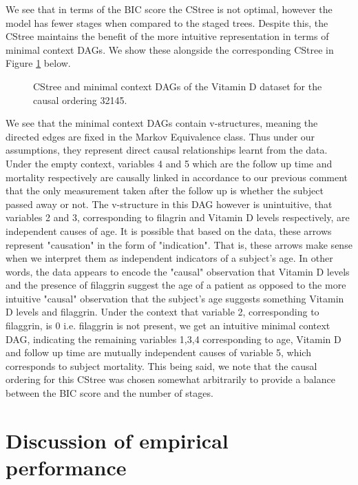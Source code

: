 \documentclass{tufte-book}
\begin{document}
We see that in terms of the BIC score the CStree is not optimal, however the model has fewer stages when compared to the staged trees. Despite this, the CStree maintains the benefit of the more intuitive representation in terms of minimal context DAGs. We show these alongside the corresponding CStree in Figure \ref{fig:vitd_mcdags} below.

\begin{figure}[!h]\label{fig:vitd_mcdags}
   \begin{floatrow}
%
\caption{ CStree and minimal context DAGs of the Vitamin D dataset for the causal ordering 32145. }
        
   \end{floatrow}
\end{figure}


We see that the minimal context DAGs contain v-structures, meaning the directed edges are fixed in the Markov Equivalence class. Thus under our assumptions, they represent direct causal relationships learnt from the data. Under the empty context, variables 4 and 5 which are the follow up time and mortality respectively are causally linked in accordance to our previous comment that the only measurement taken after the follow up is whether the subject passed away or not. The v-structure in this DAG however is unintuitive, that variables 2 and 3, corresponding to filagrin and Vitamin D levels respectively, are independent causes of age. It is possible that based on the data, these arrows represent "causation" in the form of "indication". That is, these arrows make sense when we interpret them as independent indicators of a subject's age. In other words, the data appears to encode the "causal" observation that Vitamin D levels and the presence of filaggrin suggest the age of a patient as opposed to the more intuitive "causal" observation that the subject's age suggests something Vitamin D levels and filaggrin. Under the context that variable 2, corresponding to filaggrin, is 0 i.e. filaggrin is not present, we get an intuitive minimal context DAG, indicating the remaining variables 1,3,4 corresponding to age, Vitamin D and follow up time are mutually independent causes of variable 5, which corresponds to subject mortality. This being said, we note that the causal ordering for this CStree was chosen somewhat arbitrarily to provide a balance between the BIC score and the number of stages.


\section{Discussion of empirical performance}
\label{sec:orga20243b}
\end{document}
